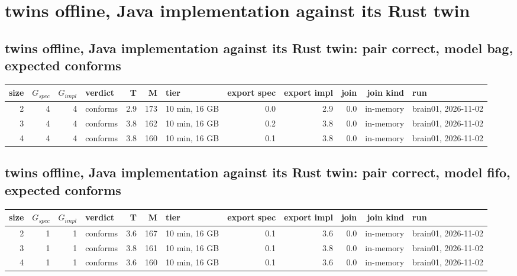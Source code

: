 \documentclass[10pt]{article}
\begin{document}
\section*{twins offline, Java implementation against its Rust twin}
\subsection*{twins offline, Java implementation against its Rust twin: pair \textsf{correct}, model bag, expected conforms}
\begin{longtable}{@{}rrrlrrlrrrrl@{}}
\toprule
size & $G_{\mathit{spec}}$ & $G_{\mathit{impl}}$ & verdict & T & M & tier & export spec & export impl & join & join kind & run \\
\midrule
\endhead
\color{red} 2 & 4 & 4 & conforms & 2.9 & 173 & 10 min, 16 GB & 0.0 & 2.9 & 0.0 & in-memory & brain01, 2026-11-02 \\
\color{red} 3 & 4 & 4 & conforms & 3.8 & 162 & 10 min, 16 GB & 0.2 & 3.8 & 0.0 & in-memory & brain01, 2026-11-02 \\
\color{red} 4 & 4 & 4 & conforms & 3.8 & 160 & 10 min, 16 GB & 0.1 & 3.8 & 0.0 & in-memory & brain01, 2026-11-02 \\
\bottomrule
\end{longtable}
\subsection*{twins offline, Java implementation against its Rust twin: pair \textsf{correct}, model fifo, expected conforms}
\begin{longtable}{@{}rrrlrrlrrrrl@{}}
\toprule
size & $G_{\mathit{spec}}$ & $G_{\mathit{impl}}$ & verdict & T & M & tier & export spec & export impl & join & join kind & run \\
\midrule
\endhead
\color{red} 2 & 1 & 1 & conforms & 3.6 & 167 & 10 min, 16 GB & 0.1 & 3.6 & 0.0 & in-memory & brain01, 2026-11-02 \\
\color{red} 3 & 1 & 1 & conforms & 3.8 & 161 & 10 min, 16 GB & 0.1 & 3.8 & 0.0 & in-memory & brain01, 2026-11-02 \\
\color{red} 4 & 1 & 1 & conforms & 3.6 & 160 & 10 min, 16 GB & 0.1 & 3.6 & 0.0 & in-memory & brain01, 2026-11-02 \\
\bottomrule
\end{longtable}
\end{document}

